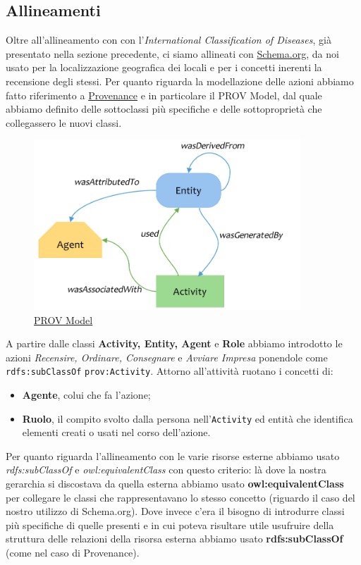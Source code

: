 \documentclass[12pt]{article}
\begin{document}
\subsection{Allineamenti}
Oltre all'allineamento con con l'\textit{International Classification of Diseases}, già presentato nella sezione precedente, ci siamo allineati con \href{https://schema.org/}{Schema.org}, da noi usato per la  localizzazione geografica dei locali e per i concetti inerenti la recensione degli stessi.\newline
Per quanto riguarda la modellazione delle azioni abbiamo fatto riferimento a \href{https://www.w3.org/TR/prov-o/}{Provenance} e in particolare il PROV Model, dal quale abbiamo definito delle sottoclassi più specifiche e delle sottoproprietà che collegassero le nuovi classi.
\begin{figure}[H]
    \centering
    \includegraphics[width=10cm]{files/provenacePattern.png}
    \caption{\href{https://en.wikipedia.org/wiki/PROV_(Provenance)}{PROV Model}}
\end{figure}
A partire dalle classi \textbf{Activity, Entity, Agent} e \textbf{Role} abbiamo introdotto le azioni \textit{Recensire, Ordinare, Consegnare} e \textit{Avviare Impresa} ponendole come \texttt{rdfs:subClassOf} \texttt{prov:Activity}. Attorno all'attività ruotano i concetti di:
\begin{itemize}
    \item \textbf{Agente}, colui che fa l'azione;
    \item \textbf{Ruolo}, il compito svolto dalla persona nell'\texttt{Activity} ed entità che identifica elementi creati o usati nel corso dell'azione.
\end{itemize}

Per quanto riguarda l'allineamento con le varie risorse esterne abbiamo usato \textit{rdfs:subClassOf} e \textit{owl:equivalentClass} con questo criterio: là dove la nostra gerarchia si discostava da quella esterna abbiamo usato \textbf{owl:equivalentClass} per collegare le classi che rappresentavano lo stesso concetto (riguardo il caso del nostro utilizzo di Schema.org).
\newline
Dove invece c'era il bisogno di introdurre classi più specifiche di quelle presenti e in cui poteva risultare utile usufruire della struttura delle relazioni della risorsa esterna abbiamo usato \textbf{rdfs:subClassOf} (come nel caso di Provenance).
\end{document}
